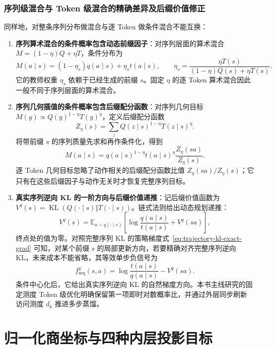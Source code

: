 \documentclass[lang=cn,scheme=chinese,openany]{elegantbook}
\newcommand{\E}{\mathbb E}
\newcommand{\KL}{\operatorname{KL}}
\begin{document}
\subsection{序列级混合与 Token 级混合的精确差异及后缀价值修正}

同样地，对整条序列分布做混合与逐 Token 做条件混合不能互换：
\begin{enumerate}
\item \textbf{序列算术混合的条件概率包含动态前缀因子}：对序列层面的算术混合 $M=(1-\eta)Q+\eta T$，条件分布为
\begin{equation}
 M(a\mid s)=(1-\eta_s)q(a\mid s)+\eta_st(a\mid s),\qquad
 \eta_s=\frac{\eta T(s)}{(1-\eta)Q(s)+\eta T(s)}.
\end{equation}
它的教师权重 $\eta_s$ 依赖于已经生成的前缀 $s$。固定 $\eta$ 的逐 Token 算术混合因此一般不同于序列层面的算术混合。
\item \textbf{序列几何插值的条件概率包含后缀配分函数}：对序列几何目标 $M(y)\propto Q(y)^{1-\eta}T(y)^\eta$，定义后缀配分函数
\begin{equation}
 Z_\eta(s)=\sum_zQ(z\mid s)^{1-\eta}T(z\mid s)^\eta.
\end{equation}
将带前缀 $s$ 的序列质量先求和再作条件化，得到
\begin{equation}
 M(a\mid s)=q(a\mid s)^{1-\eta}t(a\mid s)^\eta
 \frac{Z_\eta(sa)}{Z_\eta(s)}.
\end{equation}
逐 Token 几何目标忽略了动作相关的后缀配分函数比值 $Z_\eta(sa)/Z_\eta(s)$；它只有在这些后缀因子与动作无关时才恢复完整序列目标。
\item \textbf{真实序列逆向 KL 的一阶方向与后缀价值递推}：记后缀价值函数为 $V^q(s)=\KL(Q(\cdot\mid s)\Vert T(\cdot\mid s))$。链式法则给出动态规划递推：
\begin{equation}
 V^q(s)=\E_{a\sim q(\cdot\mid s)}\left[\log\frac{q(a\mid s)}{t(a\mid s)}+V^q(sa)\right],
\end{equation}
终点处的值为零。对照完整序列 KL 的策略梯度式~\eqref{eq:trajectory-kl-exact-grad} 可知，对某个前缀 $s$ 的局部更新方向，若要精确对齐完整序列逆向 KL，未来成本不能省略，其等效单步负信号为
\begin{equation}
 f_{\mathrm{seq}}^q(s,a)=\log\frac{t(a\mid s)}{q(a\mid s)}-V^q(sa).
\end{equation}
条件中心化后，它给出真实序列逆向 KL 的自然梯度方向。本书主线研究的固定测度 Token 级优化明确保留第一项即时对数概率比，并通过外层同步刷新访问测度 $d_k$ 推进多步蒸馏。
\end{enumerate}

\chapter{归一化商坐标与四种内层投影目标}
\label{ch:four-methods}
\end{document}
